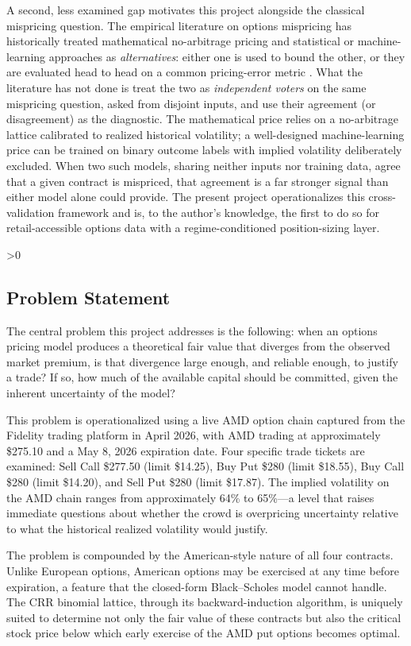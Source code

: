 \documentclass[12pt, letterpaper]{article}
\let\oldsubsection\subsection
\renewcommand{\subsection}{%
  \ifnum\value{subsection}>0 \clearpage\fi
  \oldsubsection
}
\begin{document}
A second, less examined gap motivates this project alongside the
classical mispricing question. The empirical literature on options
mispricing has historically treated mathematical no-arbitrage pricing
and statistical or machine-learning approaches as \emph{alternatives}:
either one is used to bound the other, or they are evaluated head to
head on a common pricing-error metric \citep{Carr2009, Jackwerth1996}.
What the literature has not done is treat the two as
\emph{independent voters} on the same mispricing question, asked from
disjoint inputs, and use their agreement (or disagreement) as the
diagnostic. The mathematical price relies on a no-arbitrage lattice
calibrated to realized historical volatility; a well-designed
machine-learning price can be trained on binary outcome labels with
implied volatility deliberately excluded. When two such models, sharing
neither inputs nor training data, agree that a given contract is
mispriced, that agreement is a far stronger signal than either model
alone could provide. The present project operationalizes this
cross-validation framework and is, to the author's knowledge, the first
to do so for retail-accessible options data with a regime-conditioned
position-sizing layer.

\subsection{Problem Statement}

The central problem this project addresses is the following: when an
options pricing model produces a theoretical fair value that diverges
from the observed market premium, is that divergence large enough, and
reliable enough, to justify a trade? If so, how much of the available
capital should be committed, given the inherent uncertainty of the
model?

This problem is operationalized using a live AMD option chain captured
from the Fidelity trading platform in April 2026, with AMD trading at
approximately \$275.10 and a May 8, 2026 expiration date. Four
specific trade tickets are examined: Sell Call \$277.50 (limit
\$14.25), Buy Put \$280 (limit \$18.55), Buy Call \$280 (limit
\$14.20), and Sell Put \$280 (limit \$17.87). The implied volatility on
the AMD chain ranges from approximately 64\% to 65\%---a level that
raises immediate questions about whether the crowd is overpricing
uncertainty relative to what the historical realized volatility would
justify.

The problem is compounded by the American-style nature of all four
contracts. Unlike European options, American options may be exercised
at any time before expiration, a feature that the closed-form
Black--Scholes model cannot handle. The CRR binomial lattice, through
its backward-induction algorithm, is uniquely suited to determine not
only the fair value of these contracts but also the critical stock
price below which early exercise of the AMD put options becomes
optimal.
\end{document}
